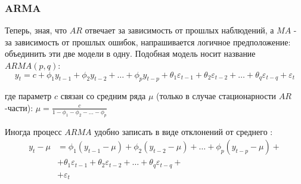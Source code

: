 





\subsubsection{ARMA}

Теперь, зная, что $AR$ отвечает за зависимость от прошлых наблюдений, а 
$MA$ - за зависимость от прошлых ошибок, напрашивается логичное предположение: 
объединить эти две модели в одну. Подобная модель носит название $ARMA(p,q)$:
\begin{equation*}
    y_t = c + 
    \phi_1 y_{t-1} + \phi_2 y_{t-2} + \dots + \phi_p y_{t-p} + 
    \theta_1 \varepsilon_{t-1} + \theta_2 \varepsilon_{t-2} + \dots + \theta_q \varepsilon_{t-q} + 
    \varepsilon_t
\end{equation*}

где параметр $c$ связан со средним ряда $\mu$ (только в случае стационарности $AR$-части): 
$\mu = \frac{c}{1 - \phi_1 - \phi_2 - \dots - \phi_p}$

Иногда процесс $ARMA$ удобно записать в виде отклонений от среднего \cite{TSA_Hamilton}:
\begin{align*}
    y_t - \mu &= \phi_1 (y_{t-1} - \mu) + \phi_2 (y_{t-2} - \mu) + \dots + \phi_p (y_{t-p} - \mu) + \\ 
    &+ \theta_1 \varepsilon_{t-1} + \theta_2 \varepsilon_{t-2} + \dots + \theta_q \varepsilon_{t-q} + \\
    &+ \varepsilon_t
\end{align*}

